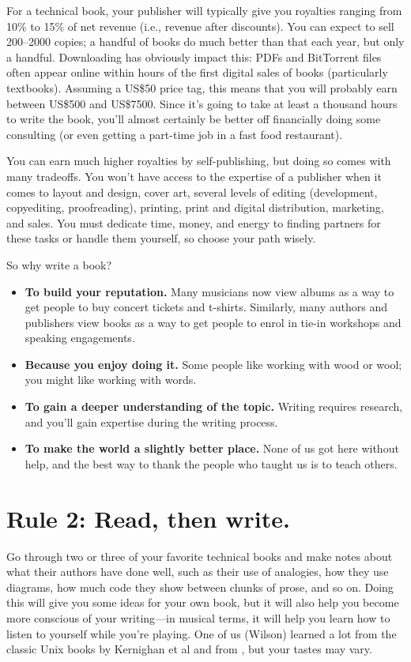 \documentclass[10pt,letterpaper]{article}
\begin{document}
For a technical book, your publisher will typically give you royalties
ranging from 10\% to 15\% of net revenue (i.e., revenue after
discounts). You can expect to sell 200--2000 copies; a handful of books
do much better than that each year, but only a handful. Downloading has
obviously impact this: PDFs and BitTorrent files often appear online
within hours of the first digital sales of books (particularly
textbooks). Assuming a US\$50 price tag, this means that you will
probably earn between US\$500 and US\$7500. Since it's going to take at
least a thousand hours to write the book, you'll almost certainly be
better off financially doing some consulting (or even getting a
part-time job in a fast food restaurant).

You can earn much higher royalties by self-publishing, but doing so
comes with many tradeoffs. You won't have access to the expertise of a
publisher when it comes to layout and design, cover art, several levels
of editing (development, copyediting, proofreading), printing, print and
digital distribution, marketing, and sales. You must dedicate time,
money, and energy to finding partners for these tasks or handle them
yourself, so choose your path wisely.

So why write a book?

\begin{itemize}
\item
  \textbf{To build your reputation.} Many musicians now view albums as a
  way to get people to buy concert tickets and t-shirts. Similarly, many
  authors and publishers view books as a way to get people to enrol in
  tie-in workshops and speaking engagements.
\item
  \textbf{Because you enjoy doing it.} Some people like working with
  wood or wool; you might like working with words.
\item
  \textbf{To gain a deeper understanding of the topic.} Writing requires
  research, and you'll gain expertise during the writing process.
\item
  \textbf{To make the world a slightly better place.} None of us got
  here without help, and the best way to thank the people who taught us
  is to teach others.
\end{itemize}

\section*{Rule 2: Read, then write.}

Go through two or three of your favorite technical books and make
notes about what their authors have done well, such as their use of
analogies, how they use diagrams, how much code they show between
chunks of prose, and so on. Doing this will give you some ideas for
your own book, but it will also help you become more conscious of your
writing---in musical terms, it will help you learn how to listen to
yourself while you're playing. One of us (Wilson) learned a lot from
the classic Unix books by Kernighan et al
\cite{Ke1979,Ke1981,Ke1983,Ke1988} and from \cite{Ud1999}, but your
tastes may vary.
\end{document}
